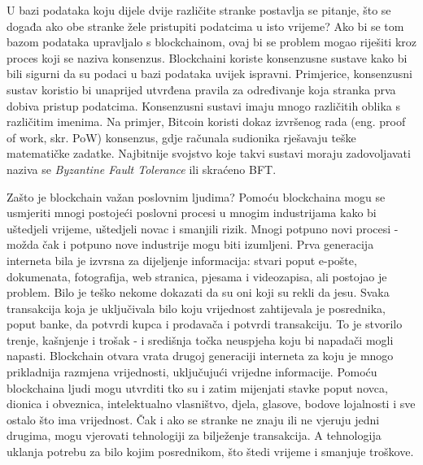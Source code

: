 \documentclass[times, utf8, diplomski]{fer}
\begin{document}
U bazi podataka koju dijele dvije različite stranke postavlja se pitanje, što se događa ako obe stranke žele pristupiti podatcima u isto vrijeme? Ako bi se tom bazom podataka upravljalo s blockchainom, ovaj bi se problem mogao riješiti kroz proces koji se naziva konsenzus. Blockchaini koriste konsenzusne sustave kako bi bili sigurni da su podaci u bazi podataka uvijek ispravni. Primjerice, konsenzusni sustav koristio bi unaprijed utvrđena pravila za određivanje koja stranka prva dobiva pristup podatcima. Konsenzusni sustavi imaju mnogo različitih oblika s različitim imenima. Na primjer, Bitcoin koristi dokaz izvršenog rada (eng. proof of work, skr. PoW) konsenzus, gdje računala sudionika rješavaju teške matematičke zadatke. Najbitnije svojstvo koje takvi sustavi moraju zadovoljavati naziva se \textit{Byzantine Fault Tolerance} ili skraćeno BFT. 

Zašto je blockchain važan poslovnim ljudima? Pomoću blockchaina mogu se usmjeriti mnogi postojeći poslovni procesi u mnogim industrijama kako bi uštedjeli vrijeme, uštedjeli novac i smanjili rizik. Mnogi potpuno novi procesi - možda čak i potpuno nove industrije mogu biti izumljeni. Prva generacija interneta bila je izvrsna za dijeljenje informacija: stvari poput e-pošte, dokumenata, fotografija, web stranica, pjesama i videozapisa, ali postojao je problem. Bilo je teško nekome dokazati da su oni koji su rekli da jesu. Svaka transakcija koja je uključivala bilo koju vrijednost zahtijevala je posrednika, poput banke, da potvrdi kupca i prodavača i potvrdi transakciju. To je stvorilo trenje, kašnjenje i trošak - i središnja točka neuspjeha koju bi napadači mogli napasti. Blockchain otvara vrata drugoj generaciji interneta za koju je mnogo prikladnija razmjena vrijednosti, uključujući vrijedne informacije. Pomoću blockchaina ljudi mogu utvrditi tko su i zatim mijenjati stavke poput novca, dionica i obveznica, intelektualno vlasništvo, djela, glasove, bodove lojalnosti i sve ostalo što ima vrijednost. Čak i ako se stranke ne znaju ili ne vjeruju jedni drugima, mogu vjerovati tehnologiji za bilježenje transakcija. A tehnologija uklanja potrebu za bilo kojim posrednikom, što štedi vrijeme i smanjuje troškove.
\end{document}
